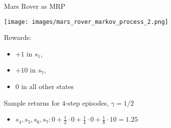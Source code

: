 \documentclass[aspectratio=169]{../latex_main/tntbeamer}  %
\begin{document}
\begin{frame}[c]{Mars Rover as MRP}
	
	\begin{center}
		\texttt{[image: images/mars\_rover\_markov\_process\_2.png]}
	\end{center}
	
	Rewards:
	\begin{itemize}
		\item $+1$ in $s_1$, 
		\item $+10$ in $s_7$,
		\item $0$ in all other states
	\end{itemize}
	
	Sample returns for $4$-step episodes, $\gamma=1/2$
	\begin{itemize}
		\item $s_4,s_5,s_6,s_7: 0 + \frac{1}{2}\cdot 0 + \frac{1}{4}\cdot 0 + \frac{1}{8}\cdot 10 = 1.25$
	\end{itemize}
	
\end{frame}
\end{document}

